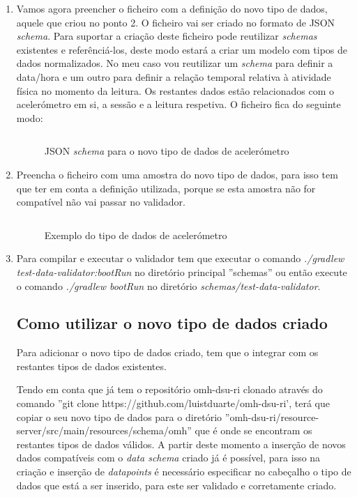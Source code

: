 \begin{enumerate}
\begin{figure}[!ht]
  \label{f:directorynewsample}
\end{figure}
  
\item Vamos agora preencher o ficheiro com a definição do novo tipo de dados, aquele que criou no ponto 2. O ficheiro vai ser criado no formato de \gls{JSON} \textit{schema}. Para suportar a criação deste ficheiro pode reutilizar \textit{schemas} existentes \cite{schema-library} e referênciá-los, deste modo estará a criar um modelo com tipos de dados normalizados. No meu caso vou reutilizar um \textit{schema} para definir a data/hora e um outro para definir a relação temporal relativa à atividade física no momento da leitura. Os restantes dados estão relacionados com o acelerómetro em si, a sessão e a leitura respetiva.
O ficheiro fica do seguinte modo: 

\begin{figure}[H]
\inputminted[fontsize=\scriptsize]{json}{code/accelerometer-1.0.json}
\caption[\gls{JSON} \textit{schema} para o novo tipo de dados de acelerómetro]{\gls{JSON} \textit{schema} para o novo tipo de dados de acelerómetro}
\label{f:accelerometer-json-schema}
\end{figure}

\item Preencha o ficheiro com uma amostra do novo tipo de dados, para isso tem que ter em conta a definição utilizada, porque se esta amostra não for compatível não vai passar no validador.

\begin{figure}[H]
\inputminted[fontsize=\scriptsize]{json}{code/example.json}
\caption[Exemplo do tipo de dados de acelerómetro]{Exemplo do tipo de dados de acelerómetro}
\label{f:accelerometer-json-data}
\end{figure}

\item Para compilar e executar o validador tem que executar o comando \textit{./gradlew test-data-validator:bootRun} no diretório principal ''schemas'' ou então execute o comando \textit{./gradlew bootRun} no diretório \textit{schemas/test-data-validator}. 

\subsection{Como utilizar o novo tipo de dados criado}

Para adicionar o novo tipo de dados criado, tem que o integrar com os restantes tipos de dados existentes. \par Tendo em conta que já tem o repositório omh-dsu-ri clonado através do comando ''git clone https://github.com/luistduarte/omh-dsu-ri', terá que copiar o seu novo tipo de dados para o diretório ''omh-dsu-ri/resource-server/src/main/resources/schema/omh'' que é onde se encontram os restantes tipos de dados válidos.
A partir deste momento a inserção de novos dados compatíveis com o \textit{data schema} criado já é possível, para isso na criação e inserção de \textit{datapoints} é necessário especificar no cabeçalho o tipo de dados que está a ser inserido, para este ser validado e corretamente criado.
\end{enumerate}

\cleardoublepage
